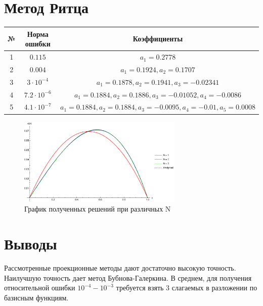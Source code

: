 \documentclass[12pt,a4paper]{article}
\begin{document}
    \section{Метод Ритца}

    \begin{center}
        \begin{tabular}{|c|c|c|} 
         \hline
         № & Норма ошибки & Коэффициенты \\ 
         \hline
         1 & $0.115$ & $a_1=0.2778$ \\ 
         \hline
         2 & $0.004$ & $a_1=0.1924, a_2=0.1707$ \\ 
         \hline
         3 & $3\cdot10^{-4}$ & $a_1=0.1878, a_2=0.1941, a_3=-0.02341$ \\ 
         \hline
         4 & $7.2\cdot10^{-6}$ & $a_1=0.1884, a_2=0.1886, a_3=-0.01052, a_4=-0.0086$ \\ 
         \hline
         5 & $4.1\cdot10^{-7}$ & $a_1=0.1884, a_2=0.1884, a_3=-0.0095, a_4=-0.01, a_5=0.0008$ \\ 
         \hline
        \end{tabular}
    \end{center}

    \begin{figure}[h]
        \centering
        \includegraphics[width=0.7\textwidth]{6.pdf}
        \caption{График полученных решений при различных N}
    \end{figure}

    \section{Выводы}

    Рассмотренные проекционные методы дают достаточно высокую точность. Наилучшую точность дает метод Бубнова-Галеркина. В среднем, для получения относительной ошибки $10^{-4}-10^{-3}$ требуется взять 3 слагаемых в разложении по базисным функциям.
\end{document}
